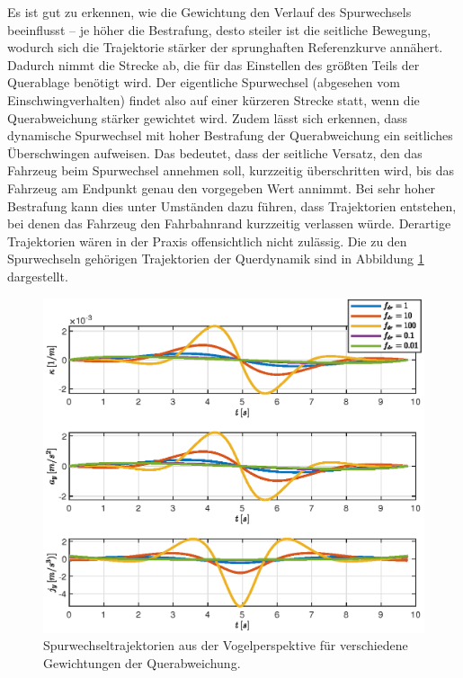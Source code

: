 Es ist gut zu erkennen, wie die Gewichtung den Verlauf des Spurwechsels beeinflusst -- je höher die Bestrafung, desto steiler ist die seitliche Bewegung, wodurch sich die Trajektorie stärker der sprunghaften Referenzkurve annähert. Dadurch nimmt die Strecke ab, die für das Einstellen des größten Teils der Querablage benötigt wird. Der eigentliche Spurwechsel (abgesehen vom Einschwingverhalten) findet also auf einer kürzeren Strecke statt, wenn die Querabweichung stärker gewichtet wird. Zudem lässt sich erkennen, dass dynamische Spurwechsel mit hoher Bestrafung der Querabweichung ein seitliches Überschwingen aufweisen. Das bedeutet, dass der seitliche Versatz, den das Fahrzeug beim Spurwechsel annehmen soll, kurzzeitig überschritten wird, bis das Fahrzeug am Endpunkt genau den vorgegeben Wert annimmt. Bei sehr hoher Bestrafung kann dies unter Umständen dazu führen, dass Trajektorien entstehen, bei denen das Fahrzeug den Fahrbahnrand kurzzeitig verlassen würde. Derartige Trajektorien wären in der Praxis offensichtlich nicht zulässig. Die zu den Spurwechseln gehörigen Trajektorien der Querdynamik sind in Abbildung \ref{fig:lat_dyn_fdr_var} dargestellt.
\begin{figure}[h] 
	\centering
	\includegraphics[width=\linewidth]{./Bilder/Ergebnisse/Geradeausfahrt/Spurwechsel/fdr_var/lat_dyn_ohne_kappa.eps}
	\caption{Spurwechseltrajektorien aus der Vogelperspektive für verschiedene Gewichtungen der Querabweichung.}
	\label{fig:lat_dyn_fdr_var}
\end{figure} 
